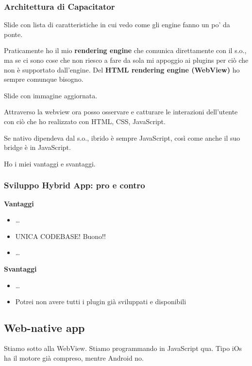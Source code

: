 \subsubsection{Architettura di Capacitator}
\par Slide con lista di caratteristiche in cui vedo come gli engine fanno un po' da ponte.
\par Praticamente ho il mio \textbf{rendering engine} che comunica direttamente con il s.o., ma se ci sono cose che non riesco a fare da sola mi appoggio ai plugins per ciò che non è supportato dall'engine. Del \textbf{HTML rendering engine (WebView)} ho sempre comunque bisogno.
\par Slide con immagine aggiornata. 
\par Attraverso la webview ora posso osservare e catturare le interazioni dell'utente con ciò che ho realizzato con HTML, CSS, JavaScript.
\par Se nativo dipendeva dal s.o., ibrido è sempre JavaScript, così come anche il suo bridge è in JavaScript.
\par Ho i miei vantaggi e svantaggi. 

\subsubsection{Sviluppo Hybrid App: pro e contro}
\par \textbf{Vantaggi}
\begin{itemize}
    \item \dots
    \item UNICA CODEBASE! Buono!!
    \item \dots
\end{itemize}

\par \textbf{Svantaggi}
\begin{itemize}
    \item \dots
    \item Potrei non avere tutti i plugin già sviluppati e disponibili
\end{itemize}

\subsection{Web-native app}
\par Stiamo sotto alla WebView. Stiamo programmando in JavaScript qua. Tipo iOs ha il motore già compreso, mentre Android no.

